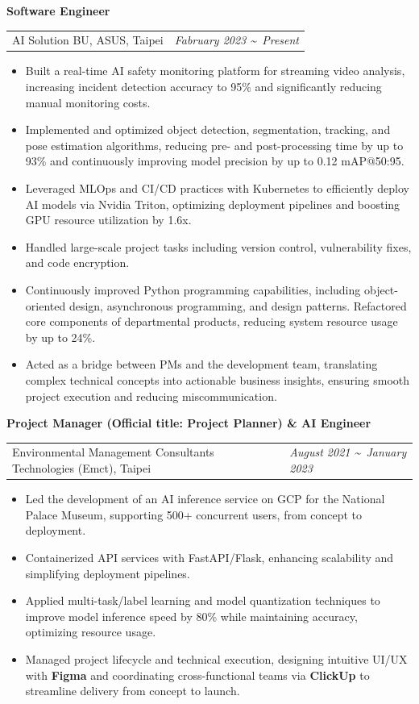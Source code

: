 \documentclass{article}
\makeatletter
\newenvironment{workexperience}[4]{
    \noindent
    \large \textbf{#1} \\ [0.1cm]
    \normalsize 
    \begin{tabular}{@{}l@{\hspace{0.5cm}}l@{}}
      #2, #3 & \textcolor{customblue}{\textit{\textsf{#4}}}  
    \end{tabular} 
    \vspace{-0.15cm}
    \fontsize{9.5pt}{12pt}\selectfont
    \begin{itemize}[leftmargin=0.6cm, labelsep=0.3cm, itemsep=-0.05cm]
}{
    \end{itemize}
}
\makeatother
\begin{document}
\begin{workexperience}{Software Engineer}{AI Solution BU, ASUS}{Taipei}{Fabruary 2023 \textasciitilde\ Present}
    \item Built a real-time AI safety monitoring platform for streaming video analysis, increasing incident detection accuracy to 95\% and significantly reducing manual monitoring costs.
    \item Implemented and optimized object detection, segmentation, tracking, and pose estimation algorithms, reducing pre- and post-processing time by up to 93\% and continuously improving model precision by up to 0.12 mAP@50:95.
    \item Leveraged MLOps and CI/CD practices with Kubernetes to efficiently deploy AI models via Nvidia Triton, optimizing deployment pipelines and boosting GPU resource utilization by 1.6x.
    \item Handled large-scale project tasks including version control, vulnerability fixes, and code encryption.
    \item Continuously improved Python programming capabilities, including object-oriented design, asynchronous programming, and design patterns. Refactored core components of departmental products, reducing system resource usage by up to 24\%.
    \item Acted as a bridge between PMs and the development team, translating complex technical concepts into actionable business insights, ensuring smooth project execution and reducing miscommunication.
\end{workexperience}

\vspace{-0.1cm}

\begin{workexperience}{Project Manager \footnotesize{(Official title: Project Planner)} \large \& AI Engineer}{Environmental Management Consultants Technologies (Emct)}{Taipei}{August 2021 \textasciitilde\ January 2023}
  \item Led the development of an AI inference service on GCP for the National Palace Museum, supporting 500+ concurrent users, from concept to deployment. 
  \item Containerized API services with FastAPI/Flask, enhancing scalability and simplifying deployment pipelines.
  \item Applied multi-task/label learning and model quantization techniques to improve model inference speed by 80\% while maintaining accuracy, optimizing resource usage.
  \item Managed project lifecycle and technical execution, designing intuitive UI/UX with \textbf{\textcolor{customblue}{Figma}} and coordinating cross-functional teams via \textbf{\textcolor{customblue}{ClickUp}} to streamline delivery from concept to launch.
\end{workexperience}
\end{document}
